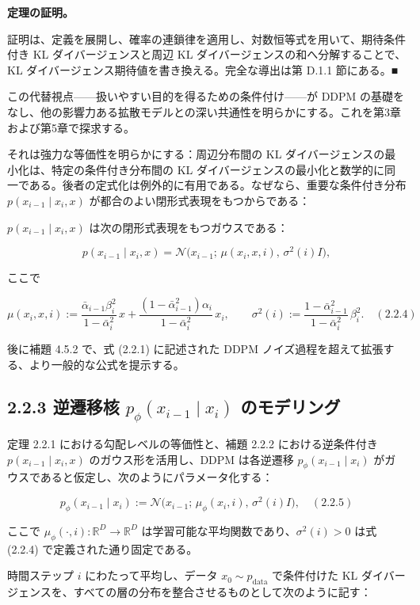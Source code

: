 \textbf{定理の証明。}

証明は、定義を展開し、確率の連鎖律を適用し、対数恒等式を用いて、期待条件付き KL ダイバージェンスと周辺 KL ダイバージェンスの和へ分解することで、KL ダイバージェンス期待値を書き換える。完全な導出は第 D.1.1 節にある。■

この代替視点——扱いやすい目的を得るための条件付け——が DDPM の基礎をなし、他の影響力ある拡散モデルとの深い共通性を明らかにする。これを第3章および第5章で探求する。

それは強力な等価性を明らかにする：周辺分布間の KL ダイバージェンスの最小化は、特定の条件付き分布間の KL ダイバージェンスの最小化と数学的に同一である。後者の定式化は例外的に有用である。なぜなら、重要な条件付き分布 $p(x_{i-1}\mid x_i,x)$ が都合のよい閉形式表現をもつからである：

\begin{propositionbox}[補題 2.2.2: 逆条件付き遷移核]
$p(x_{i-1}\mid x_i,x)$ は次の閉形式表現をもつガウスである：

\[
p(x_{i-1}\mid x_i,x) = \mathcal{N}\bigl(x_{i-1};\, \mu(x_i,x,i),\, \sigma^2(i)I\bigr),
\]

ここで

\[
\mu(x_i,x,i) := \frac{\bar{\alpha}_{i-1}\beta_i^2}{1-\bar{\alpha}_i^2}\, x + \frac{(1-\bar{\alpha}_{i-1}^2)\alpha_i}{1-\bar{\alpha}_i^2}\, x_i, \qquad
\sigma^2(i) := \frac{1-\bar{\alpha}_{i-1}^2}{1-\bar{\alpha}_i^2}\,\beta_i^2. \quad (2.2.4)
\]
\end{propositionbox}


後に補題 4.5.2 で、式 (2.2.1) に記述された DDPM ノイズ過程を超えて拡張する、より一般的な公式を提示する。

\subsection*{2.2.3 逆遷移核 $p_\phi(x_{i-1}\mid x_i)$ のモデリング}


定理 2.2.1 における勾配レベルの等価性と、補題 2.2.2 における逆条件付き $p(x_{i-1}\mid x_i,x)$ のガウス形を活用し、DDPM は各逆遷移 $p_\phi(x_{i-1}\mid x_i)$ がガウスであると仮定し、次のようにパラメータ化する：

\[
p_\phi(x_{i-1}\mid x_i) := \mathcal{N}\bigl(x_{i-1};\, \mu_\phi(x_i,i),\, \sigma^2(i)I\bigr), \quad (2.2.5)
\]


ここで $\mu_\phi(\cdot,i):\mathbb{R}^D\to\mathbb{R}^D$ は学習可能な平均関数であり、$\sigma^2(i)>0$ は式 (2.2.4) で定義された通り固定である。

時間ステップ $i$ にわたって平均し、データ $x_0\sim p_{\mathrm{data}}$ で条件付けた KL ダイバージェンスを、すべての層の分布を整合させるものとして次のように記す：

